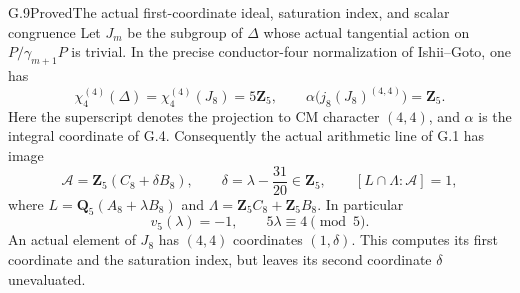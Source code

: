 \begin{statement}{G.9}{Proved}{The actual first-coordinate ideal, saturation index, and scalar congruence}
Let $J_m$ be the subgroup of $\Delta$ whose actual tangential
action on $P/\gamma_{m+1}P$ is trivial. In the precise
conductor-four normalization of Ishii--Goto, one has
\[
 \chi^{(4)}_4(\Delta)=\chi^{(4)}_4(J_8)=5\mathbf Z_5,
 \qquad
 \alpha\bigl(j_8(J_8)^{(4,4)}\bigr)=\mathbf Z_5.
\]
Here the superscript denotes the projection to CM character
$(4,4)$, and $\alpha$ is the integral coordinate of G.4.
Consequently the actual arithmetic line of G.1 has image
\[
 \mathcal A=\mathbf Z_5(C_8+\delta B_8),\qquad
 \delta=\lambda-\frac{31}{20}\in\mathbf Z_5,
 \qquad [L\cap\Lambda:\mathcal A]=1,
\]
where $L=\mathbf Q_5(A_8+\lambda B_8)$ and
$\Lambda=\mathbf Z_5C_8+\mathbf Z_5B_8$. In particular
\[
 v_5(\lambda)=-1,\qquad 5\lambda\equiv4\pmod5.
\]
An actual element of $J_8$ has $(4,4)$ coordinates $(1,\delta)$.
This computes its first coordinate and the saturation index,
but leaves its second coordinate $\delta$ unevaluated.
\end{statement}
